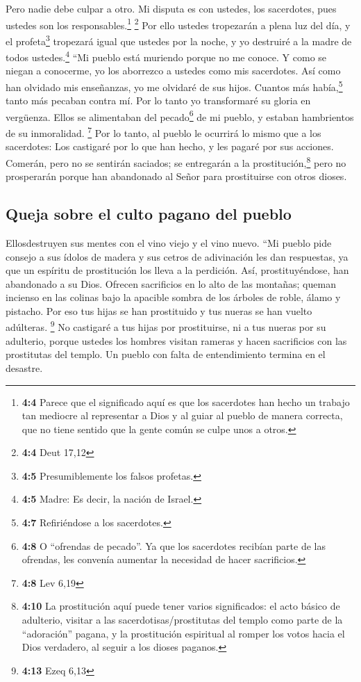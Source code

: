  Pero nadie debe culpar a otro. Mi disputa es con ustedes,
los sacerdotes, pues ustedes son los responsables.\footnote{\textbf{4:4}
  Parece que el significado aquí es que los sacerdotes han hecho un
  trabajo tan mediocre al representar a Dios y al guiar al pueblo de
  manera correcta, que no tiene sentido que la gente común se culpe unos
  a otros.} \footnote{\textbf{4:4} Deut 17,12}  Por ello
ustedes tropezarán a plena luz del día, y el profeta\footnote{\textbf{4:5}
  Presumiblemente los falsos profetas.} tropezará igual que ustedes por
la noche, y yo destruiré a la madre de todos ustedes.\footnote{\textbf{4:5}
  Madre: Es decir, la nación de Israel.}  ``Mi pueblo está
muriendo porque no me conoce. Y como se niegan a conocerme, yo los
aborrezco a ustedes como mis sacerdotes. Así como han olvidado mis
enseñanzas, yo me olvidaré de sus hijos.  Cuantos más
había,\footnote{\textbf{4:7} Refiriéndose a los sacerdotes.} tanto más
pecaban contra mí. Por lo tanto yo transformaré su gloria en vergüenza.
 Ellos se alimentaban del pecado\footnote{\textbf{4:8} O
  ``ofrendas de pecado''. Ya que los sacerdotes recibían parte de las
  ofrendas, les convenía aumentar la necesidad de hacer sacrificios.} de
mi pueblo, y estaban hambrientos de su inmoralidad. \footnote{\textbf{4:8}
  Lev 6,19}  Por lo tanto, al pueblo le ocurrirá lo mismo
que a los sacerdotes: Los castigaré por lo que han hecho, y les pagaré
por sus acciones.  Comerán, pero no se sentirán saciados;
se entregarán a la prostitución,\footnote{\textbf{4:10} La prostitución
  aquí puede tener varios significados: el acto básico de adulterio,
  visitar a las sacerdotisas/prostitutas del templo como parte de la
  ``adoración'' pagana, y la prostitución espiritual al romper los votos
  hacia el Dios verdadero, al seguir a los dioses paganos.} pero no
prosperarán porque han abandonado al Señor para prostituirse con otros
dioses.

\hypertarget{queja-sobre-el-culto-pagano-del-pueblo}{%
\subsection{Queja sobre el culto pagano del
pueblo}\label{queja-sobre-el-culto-pagano-del-pueblo}}

 Ellosdestruyen sus mentes con el vino viejo y el vino
nuevo.  ``Mi pueblo pide consejo a sus ídolos de madera y
sus cetros de adivinación les dan respuestas, ya que un espíritu de
prostitución los lleva a la perdición. Así, prostituyéndose, han
abandonado a su Dios.  Ofrecen sacrificios en lo alto de
las montañas; queman incienso en las colinas bajo la apacible sombra de
los árboles de roble, álamo y pistacho. Por eso tus hijas se han
prostituido y tus nueras se han vuelto adúlteras. \footnote{\textbf{4:13}
  Ezeq 6,13}  No castigaré a tus hijas por prostituirse,
ni a tus nueras por su adulterio, porque ustedes los hombres visitan
rameras y hacen sacrificios con las prostitutas del templo. Un pueblo
con falta de entendimiento termina en el desastre.

